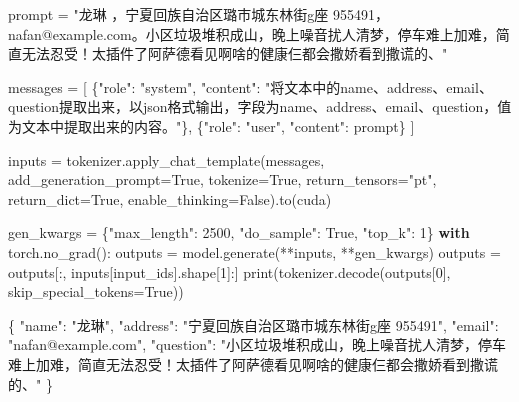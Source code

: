 \documentclass[
]{article}
\newenvironment{Shaded}{}{}
\newcommand{\BuiltInTok}[1]{\textcolor[rgb]{0.00,0.50,0.00}{#1}}
\newcommand{\ControlFlowTok}[1]{\textcolor[rgb]{0.00,0.44,0.13}{\textbf{#1}}}
\newcommand{\DataTypeTok}[1]{\textcolor[rgb]{0.56,0.13,0.00}{#1}}
\newcommand{\DecValTok}[1]{\textcolor[rgb]{0.25,0.63,0.44}{#1}}
\newcommand{\FunctionTok}[1]{\textcolor[rgb]{0.02,0.16,0.49}{#1}}
\newcommand{\NormalTok}[1]{#1}
\newcommand{\OperatorTok}[1]{\textcolor[rgb]{0.40,0.40,0.40}{#1}}
\newcommand{\StringTok}[1]{\textcolor[rgb]{0.25,0.44,0.63}{#1}}
\newcommand{\VariableTok}[1]{\textcolor[rgb]{0.10,0.09,0.49}{#1}}
\begin{document}
\begin{Shaded}
\begin{Highlighting}[]
\NormalTok{prompt }\OperatorTok{=} \StringTok{"龙琳   ，宁夏回族自治区璐市城东林街g座 955491，nafan@example.com。小区垃圾堆积成山，晚上噪音扰人清梦，停车难上加难，简直无法忍受！太插件了阿萨德看见啊啥的健康仨都会撒娇看到撒谎的、"}

\NormalTok{messages }\OperatorTok{=}\NormalTok{ [}
\NormalTok{    \{}\StringTok{"role"}\NormalTok{: }\StringTok{"system"}\NormalTok{, }\StringTok{"content"}\NormalTok{: }\StringTok{"将文本中的name、address、email、question提取出来，以json格式输出，字段为name、address、email、question，值为文本中提取出来的内容。"}\NormalTok{\},}
\NormalTok{    \{}\StringTok{"role"}\NormalTok{: }\StringTok{"user"}\NormalTok{, }\StringTok{"content"}\NormalTok{: prompt\}}
\NormalTok{]}

\NormalTok{inputs }\OperatorTok{=}\NormalTok{ tokenizer.apply\_chat\_template(messages,}
\NormalTok{                                       add\_generation\_prompt}\OperatorTok{=}\VariableTok{True}\NormalTok{,}
\NormalTok{                                       tokenize}\OperatorTok{=}\VariableTok{True}\NormalTok{,}
\NormalTok{                                       return\_tensors}\OperatorTok{=}\StringTok{"pt"}\NormalTok{,}
\NormalTok{                                       return\_dict}\OperatorTok{=}\VariableTok{True}\NormalTok{,}
\NormalTok{                                       enable\_thinking}\OperatorTok{=}\VariableTok{False}\NormalTok{).to(}\StringTok{\textquotesingle{}cuda\textquotesingle{}}\NormalTok{)}

\NormalTok{gen\_kwargs }\OperatorTok{=}\NormalTok{ \{}\StringTok{"max\_length"}\NormalTok{: }\DecValTok{2500}\NormalTok{, }\StringTok{"do\_sample"}\NormalTok{: }\VariableTok{True}\NormalTok{, }\StringTok{"top\_k"}\NormalTok{: }\DecValTok{1}\NormalTok{\}}
\ControlFlowTok{with}\NormalTok{ torch.no\_grad():}
\NormalTok{    outputs }\OperatorTok{=}\NormalTok{ model.generate(}\OperatorTok{**}\NormalTok{inputs, }\OperatorTok{**}\NormalTok{gen\_kwargs)}
\NormalTok{    outputs }\OperatorTok{=}\NormalTok{ outputs[:, inputs[}\StringTok{\textquotesingle{}input\_ids\textquotesingle{}}\NormalTok{].shape[}\DecValTok{1}\NormalTok{]:]}
    \BuiltInTok{print}\NormalTok{(tokenizer.decode(outputs[}\DecValTok{0}\NormalTok{], skip\_special\_tokens}\OperatorTok{=}\VariableTok{True}\NormalTok{))}
\end{Highlighting}
\end{Shaded}

\begin{Shaded}
\begin{Highlighting}[]
\FunctionTok{\{}
    \DataTypeTok{"name"}\FunctionTok{:} \StringTok{"龙琳"}\FunctionTok{,}
    \DataTypeTok{"address"}\FunctionTok{:} \StringTok{"宁夏回族自治区璐市城东林街g座 955491"}\FunctionTok{,}
    \DataTypeTok{"email"}\FunctionTok{:} \StringTok{"nafan@example.com"}\FunctionTok{,}
    \DataTypeTok{"question"}\FunctionTok{:} \StringTok{"小区垃圾堆积成山，晚上噪音扰人清梦，停车难上加难，简直无法忍受！太插件了阿萨德看见啊啥的健康仨都会撒娇看到撒谎的、"}
\FunctionTok{\}}
\end{Highlighting}
\end{Shaded}
\end{document}
